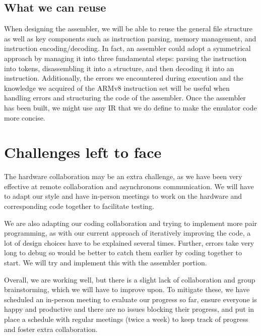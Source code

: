 \documentclass[11pt]{article}
\begin{document}
\subsection*{What we can reuse}

When designing the assembler, we will be able to reuse the general file structure as well as key components such as instruction parsing, memory management, and instruction encoding/decoding. In fact, an assembler could adopt a symmetrical approach by managing it into three fundamental steps: parsing the instruction into tokens, disassembling it into a structure, and then decoding it into an instruction. Additionally, the errors we encountered during execution and the knowledge we acquired of the ARMv8 instruction set will be useful when handling errors and structuring the code of the assembler. Once the assembler has been built, we might use any IR that we do define to make the emulator code more concise.

\section{Challenges left to face}

The hardware collaboration may be an extra challenge, as we have been very effective at remote collaboration and asynchronous communication. We will have to adapt our style and have in-person meetings to work on the hardware and corresponding code together to facilitate testing.

We are also adapting our coding collaboration and trying to implement more pair programming, as with our current approach of iteratively improving the code, a lot of design choices have to be explained several times. Further, errors take very long to debug so would be better to catch them earlier by coding together to start. We will try and implement this with the assembler portion.

Overall, we are working well, but there is a slight lack of collaboration and group brainstorming, which we will have to improve upon. To mitigate these, we have scheduled an in-person meeting to evaluate our progress so far, ensure everyone is happy and productive and there are no issues blocking their progress, and put in place a schedule with regular meetings (twice a week) to keep track of progress and foster extra collaboration.
\end{document}
